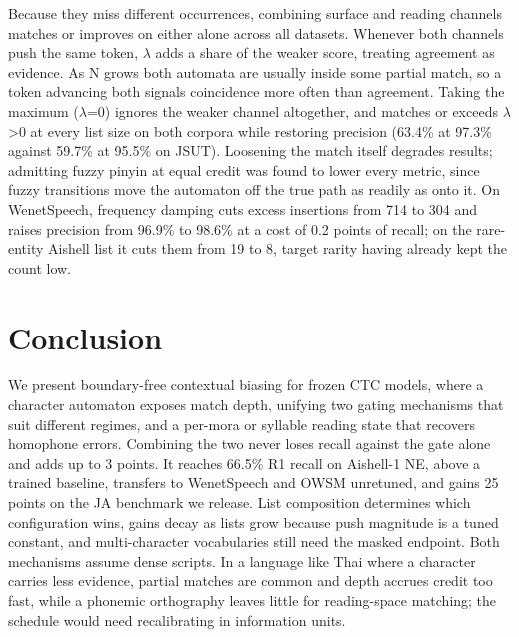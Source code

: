 \documentclass{article}
\begin{document}

Because they miss different occurrences, combining surface and reading channels matches or improves on either alone across all datasets. Whenever both channels push the same token, $\lambda$ adds a share of the weaker score, treating agreement as evidence. As N grows both automata are usually inside some partial match, so a token advancing both signals coincidence more often than agreement. Taking the maximum ($\lambda$=0) ignores the weaker channel altogether, and matches or exceeds $\lambda$>0 at every list size on both corpora while restoring precision (63.4\% at 97.3\% against 59.7\% at 95.5\% on JSUT). Loosening the match itself degrades results; admitting fuzzy pinyin at equal credit was found to lower every metric, since fuzzy transitions move the automaton off the true path as readily as onto it. On WenetSpeech, frequency damping cuts excess insertions from 714 to 304 and raises precision from 96.9\% to 98.6\% at a cost of 0.2 points of recall; on the rare-entity Aishell list it cuts them from 19 to 8, target rarity having already kept the count low.


\section{Conclusion}
We present boundary-free contextual biasing for frozen CTC models, where a character automaton exposes match depth, unifying two gating mechanisms that suit different regimes, and a per-mora or syllable reading state that recovers homophone errors. Combining the two never loses recall against the gate alone and adds up to 3 points. It reaches 66.5\% R1 recall on Aishell-1 NE, above a trained baseline, transfers to WenetSpeech and OWSM unretuned, and gains 25 points on the JA benchmark we release. List composition determines which configuration wins, gains decay as lists grow because push magnitude is a tuned constant, and multi-character vocabularies still need the masked endpoint. Both mechanisms assume dense scripts. In a language like Thai where a character carries less evidence, partial matches are common and depth accrues credit too fast, while a phonemic orthography leaves little for reading-space matching; the schedule would need recalibrating in information units.
\end{document}
